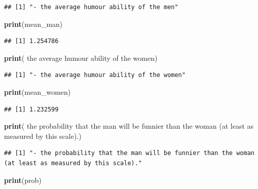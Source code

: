 \documentclass[
  9pt,
]{article}
\newenvironment{Shaded}{\begin{snugshade}}{\end{snugshade}}
\newcommand{\KeywordTok}[1]{\textcolor[rgb]{0.13,0.29,0.53}{\textbf{#1}}}
\newcommand{\NormalTok}[1]{#1}
\newcommand{\StringTok}[1]{\textcolor[rgb]{0.31,0.60,0.02}{#1}}
\begin{document}
\begin{verbatim}
## [1] "- the average humour ability of the men"
\end{verbatim}

\begin{Shaded}
\begin{Highlighting}[]
      \KeywordTok{print}\NormalTok{(mean\_man)}
\end{Highlighting}
\end{Shaded}

\begin{verbatim}
## [1] 1.254786
\end{verbatim}

\begin{Shaded}
\begin{Highlighting}[]
      \KeywordTok{print}\NormalTok{(}\StringTok{\textquotesingle{}{-} the average humour ability of the women\textquotesingle{}}\NormalTok{)}
\end{Highlighting}
\end{Shaded}

\begin{verbatim}
## [1] "- the average humour ability of the women"
\end{verbatim}

\begin{Shaded}
\begin{Highlighting}[]
      \KeywordTok{print}\NormalTok{(mean\_women)}
\end{Highlighting}
\end{Shaded}

\begin{verbatim}
## [1] 1.232599
\end{verbatim}

\begin{Shaded}
\begin{Highlighting}[]
      \KeywordTok{print}\NormalTok{(}\StringTok{\textquotesingle{}{-} the probability that the man will be funnier than the woman (at least as measured by this scale).\textquotesingle{}}\NormalTok{)}
\end{Highlighting}
\end{Shaded}

\begin{verbatim}
## [1] "- the probability that the man will be funnier than the woman (at least as measured by this scale)."
\end{verbatim}

\begin{Shaded}
\begin{Highlighting}[]
      \KeywordTok{print}\NormalTok{(prob)}
\end{Highlighting}
\end{Shaded}
\end{document}

